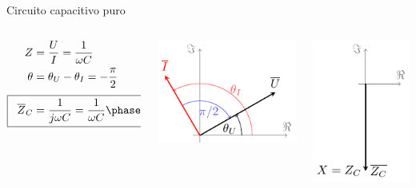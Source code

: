 \documentclass[aspectratio=169, usenames,svgnames,dvipsnames]{beamer}
\begin{document}
\begin{frame}{Circuito capacitivo puro}
\begin{columns}
\begin{column}{0.3\columnwidth}
        \vspace{-4mm}
        \begin{align*}
          Z &= \frac{U}{I} = \frac{1}{\omega C}\\
          \theta &= \theta_U - \theta_I = - \frac{\pi}{2}\\[3pt]
          \Aboxed{\;\; \overline{Z}_C &= \frac{1}{j\omega C} = \frac{1}{\omega C}\phase{\ang{-90}} \;\;}
        \end{align*}
    \end{column}
    \begin{column}{0.4\columnwidth}
        \begin{center}
            \includegraphics[height=0.4\textheight]{../figs/fasorCondensador_VI.pdf}
        \end{center}
    \end{column}  
    \begin{column}{0.3\columnwidth}
        \begin{center}
            \includegraphics[height=0.4\textheight]{../figs/fasorCondensador.pdf}
        \end{center}
    \end{column}
    \end{columns}
\end{frame}

\end{document}
